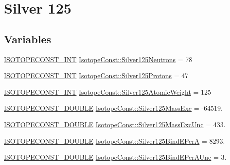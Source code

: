 \hypertarget{group___isotope_const-_silver-_ag125}{}\section{Silver 125}
\label{group___isotope_const-_silver-_ag125}
\subsection*{Variables}
\begin{DoxyCompactItemize}
\item 
\mbox{\hyperlink{group___isotope_const-_macros_ga5f18360b3e99483a35c32d789e62621c}{I\+S\+O\+T\+O\+P\+E\+C\+O\+N\+S\+T\+\_\+\+I\+NT}} \mbox{\hyperlink{group___isotope_const-_silver-_ag125_gab0cdd29f9d1dfdae6dc08a6fffa3fe75}{Isotope\+Const\+::\+Silver125\+Neutrons}} = 78
\item 
\mbox{\hyperlink{group___isotope_const-_macros_ga5f18360b3e99483a35c32d789e62621c}{I\+S\+O\+T\+O\+P\+E\+C\+O\+N\+S\+T\+\_\+\+I\+NT}} \mbox{\hyperlink{group___isotope_const-_silver-_ag125_ga5db6bbf17208284d59b22885547d3dc4}{Isotope\+Const\+::\+Silver125\+Protons}} = 47
\item 
\mbox{\hyperlink{group___isotope_const-_macros_ga5f18360b3e99483a35c32d789e62621c}{I\+S\+O\+T\+O\+P\+E\+C\+O\+N\+S\+T\+\_\+\+I\+NT}} \mbox{\hyperlink{group___isotope_const-_silver-_ag125_ga2cf75e5fae95fc3d80cf2351b90b12b3}{Isotope\+Const\+::\+Silver125\+Atomic\+Weight}} = 125
\item 
\mbox{\hyperlink{group___isotope_const-_macros_ga8f45a7272ce02c0b4c65c44636ed719a}{I\+S\+O\+T\+O\+P\+E\+C\+O\+N\+S\+T\+\_\+\+D\+O\+U\+B\+LE}} \mbox{\hyperlink{group___isotope_const-_silver-_ag125_ga0ef745ab712f1f1ad4b1b5720cfe8add}{Isotope\+Const\+::\+Silver125\+Mass\+Exc}} = -\/64519.
\item 
\mbox{\hyperlink{group___isotope_const-_macros_ga8f45a7272ce02c0b4c65c44636ed719a}{I\+S\+O\+T\+O\+P\+E\+C\+O\+N\+S\+T\+\_\+\+D\+O\+U\+B\+LE}} \mbox{\hyperlink{group___isotope_const-_silver-_ag125_ga200bca8eac851e64dae095c90a8d8029}{Isotope\+Const\+::\+Silver125\+Mass\+Exc\+Unc}} = 433.
\item 
\mbox{\hyperlink{group___isotope_const-_macros_ga8f45a7272ce02c0b4c65c44636ed719a}{I\+S\+O\+T\+O\+P\+E\+C\+O\+N\+S\+T\+\_\+\+D\+O\+U\+B\+LE}} \mbox{\hyperlink{group___isotope_const-_silver-_ag125_gafe590bfacf2673b2926f5c1007361540}{Isotope\+Const\+::\+Silver125\+Bind\+E\+PerA}} = 8293.
\item 
\mbox{\hyperlink{group___isotope_const-_macros_ga8f45a7272ce02c0b4c65c44636ed719a}{I\+S\+O\+T\+O\+P\+E\+C\+O\+N\+S\+T\+\_\+\+D\+O\+U\+B\+LE}} \mbox{\hyperlink{group___isotope_const-_silver-_ag125_ga9dfb1254b7771df3a3148d24cee499d3}{Isotope\+Const\+::\+Silver125\+Bind\+E\+Per\+A\+Unc}} = 3.

\end{DoxyCompactItemize}
